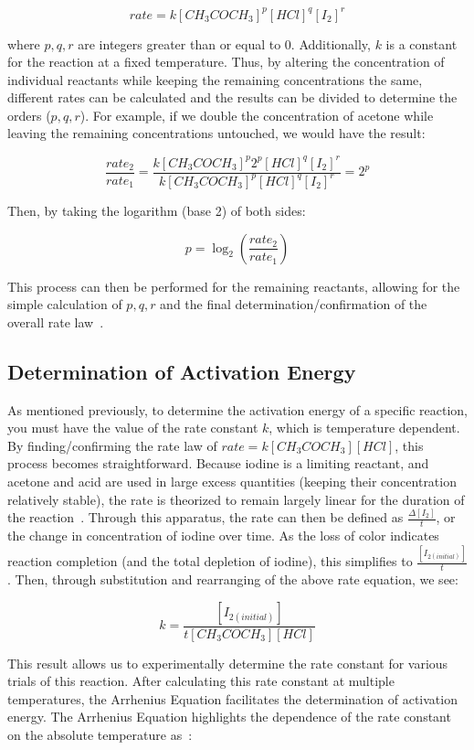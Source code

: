 \[rate = k[CH_3COCH_3]^p[HCl]^q[I_2]^r\]

where $p,q,r$ are integers greater than or equal to $0$. Additionally, $k$ is a constant for the reaction at a fixed temperature. Thus, by altering the concentration of individual reactants while keeping the remaining concentrations the same, different rates can be calculated and the results can be divided to determine the orders ($p,q,r$). For example, if we double the concentration of acetone while leaving the remaining concentrations untouched, we would have the result:

\[\frac{rate_2}{rate_1} = \frac{k[CH_3COCH_3]^p2^p[HCl]^q[I_2]^r}{k[CH_3COCH_3]^p[HCl]^q[I_2]^r} = 2^p\]

Then, by taking the logarithm (base 2) of both sides:

\[p = \log_2 \left(\frac{rate_2}{rate_1}\right)\]

This process can then be performed for the remaining reactants, allowing for the simple calculation of $p,q,r$ and the final determination/confirmation of the overall rate law~\parencite{intro_chemistryj}.

\subsection{Determination of Activation Energy}
As mentioned previously, to determine the activation energy of a specific reaction, you must have the value of the rate constant $k$, which is temperature dependent. By finding/confirming the rate law of $rate = k[CH_3COCH_3][HCl]$, this process becomes straightforward. Because iodine is a limiting reactant, and acetone and acid are used in large excess quantities (keeping their concentration relatively stable), the rate is theorized to remain largely linear for the duration of the reaction~\parencite{other_literature_2}. Through this apparatus, the rate can then be defined as $\frac{\Delta [I_2]}{t}$, or the change in concentration of iodine over time. As the loss of color indicates reaction completion (and the total depletion of iodine), this simplifies to $\frac{[I_{2(initial)}]}{t}$. Then, through substitution and rearranging of the above rate equation, we see:

\[k = \frac{[I_{2(initial)}]}{t[CH_3COCH_3][HCl]}\]

This result allows us to experimentally determine the rate constant for various trials of this reaction. After calculating this rate constant at multiple temperatures, the Arrhenius Equation facilitates the determination of activation energy. The Arrhenius Equation highlights the dependence of the rate constant on the absolute temperature as~\parencite{arrhenius}:

